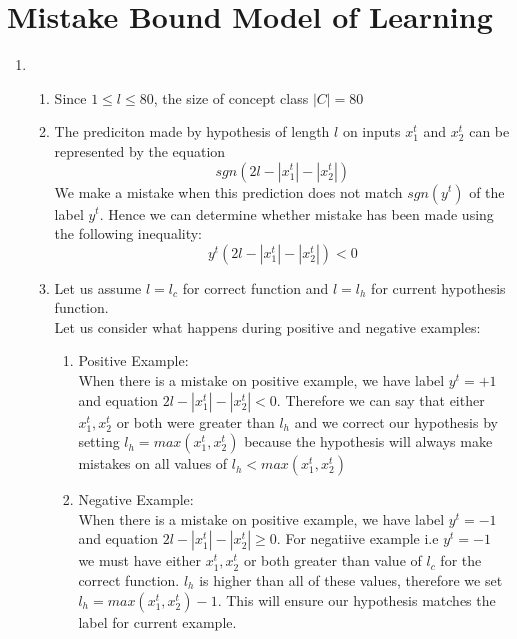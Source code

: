 \section{Mistake Bound Model of Learning}\label{sec:q2}

\begin{enumerate}
    \item~
    
    
	\begin{enumerate}
		\item
			Since $1 \leq l \leq 80$, the size of concept class $|C| = 80$	
		
		\item
			The prediciton made by hypothesis of length $l$ on inputs $x_1^t$ and $x_2^t$ can be represented by the equation $$ sgn(2l - |x_1^t| - |x_2^t|) $$ 
			We make a mistake when this prediction does not match $sgn(y^t)$ of the label $y^t$. Hence we can determine whether mistake has been made using the following inequality:					
			\begin{equation}
				\boxed{				
					y^t(2l - |x_1^t| - |x_2^t|) < 0	
				}	
			\end{equation}
	
		\item
		Let us assume $l = l_c$ for correct function and $l = l_h$ for current hypothesis function.\\
		Let us consider what happens during positive and negative examples:
		\begin{enumerate}
			\item Positive Example: \\
			When there is a mistake on positive example, we have label $y^t = +1$ and equation $2l - |x_1^t| - |x_2^t| < 0$. Therefore we can say that either $x_1^t, x_2^t$ or both were greater than $l_h$ and we correct our hypothesis by setting $l_h = max(x_1^t, x_2^t)$ because the hypothesis will always make mistakes on all values of $l_h < max(x_1^t, x_2^t)$
			
			\item Negative Example: \\
			When there is a mistake on positive example, we have label $y^t = -1$ and equation $2l - |x_1^t| - |x_2^t| \geq 0$. For negatiive example i.e $y^t = -1$ we must have either $x_1^t, x_2^t$ or both greater than value of $l_c$ for the correct function. $l_h$ is higher than all of these values, therefore we set $l_h = max(x_1^t, x_2^t) - 1$. This will ensure our hypothesis matches the label for current example.
		\end{enumerate}
			

\end{enumerate}
\end{enumerate}
